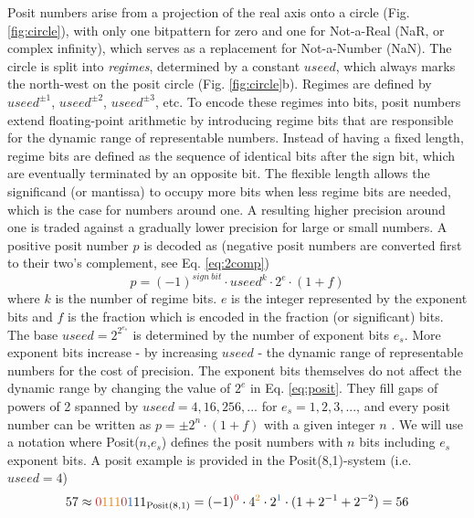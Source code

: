 Posit numbers arise from a projection of the real axis onto a circle (Fig. \ref{fig:circle}), with only one bitpattern for zero and one
for Not-a-Real (NaR, or complex infinity), which serves as a replacement for Not-a-Number (NaN). The circle is split into
\emph{regimes}, determined by a constant $useed$, which always marks the north-west on the posit circle (Fig. \ref{fig:circle}b).
Regimes are defined by $useed^{\pm1}$, $useed^{\pm2}$, $useed^{\pm3}$, etc. To encode these regimes into bits, posit
numbers extend floating-point arithmetic by introducing regime bits that are responsible for the dynamic range of representable
numbers. Instead of having a fixed length, regime bits are defined as the sequence of identical bits after the sign bit, which are
eventually terminated by an opposite bit. The flexible length allows the significand (or mantissa) to occupy more bits when less
regime bits are needed, which is the case for numbers around one. A resulting higher precision around one is traded against a
gradually lower precision for large or small numbers. A positive posit number $p$ is decoded as
\citep{Gustafson2017,Gustafson2017a,Klower2019} (negative posit numbers are converted first to their two's complement, see
Eq. \ref{eq:2comp})
\begin{equation}
p = (-1)^{sign~bit} \cdot useed^k \cdot 2^e \cdot (1+f)
\label{eq:posit}
\end{equation}
where $k$ is the number of regime bits. $e$ is the integer represented by the exponent bits and $f$ is the fraction which is
encoded in the fraction (or significant) bits. The base $useed = 2^{2^{e_s}}$ is determined by the number of exponent bits
$e_s$. More exponent bits increase - by increasing $useed$ - the dynamic range of representable numbers for the cost of precision.
The exponent bits themselves do not affect the dynamic range by changing the value of $2^e$ in Eq. \ref{eq:posit}. They fill gaps of
powers of 2 spanned by $useed = 4,16,256,...$ for $e_s=1,2,3,...$, and every posit number can be written as $p = \pm 2^n \cdot (1+f)$
with a given integer $n$ \citep{Gustafson2017,Chen2018}. We will use a notation where Posit($n$,$e_s$) defines the posit numbers
with $n$ bits including $e_s$ exponent bits. A posit example is provided in the Posit(8,1)-system (i.e. $useed = 4$)
\begin{equation}
57 \approx {\color{psign}0}{\color{pregime}111}{\color{pregimet}0}{\color{pexpo}1}11_{\op{Posit}(8,1)} = (-1)^{\color{psign}0}
\cdot 4^{\color{pregime}2} \cdot 2^{\color{pexpo}1} \cdot (1+2^{-1}+2^{-2}) = 56
\label{eq:posit_pos}
\end{equation}
